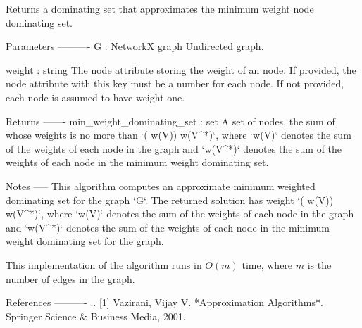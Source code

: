 \begin{DoxyVerb}Returns a dominating set that approximates the minimum weight node
dominating set.

Parameters
----------
G : NetworkX graph
    Undirected graph.

weight : string
    The node attribute storing the weight of an node. If provided,
    the node attribute with this key must be a number for each
    node. If not provided, each node is assumed to have weight one.

Returns
-------
min_weight_dominating_set : set
    A set of nodes, the sum of whose weights is no more than `(\log
    w(V)) w(V^*)`, where `w(V)` denotes the sum of the weights of
    each node in the graph and `w(V^*)` denotes the sum of the
    weights of each node in the minimum weight dominating set.

Notes
-----
This algorithm computes an approximate minimum weighted dominating
set for the graph `G`. The returned solution has weight `(\log
w(V)) w(V^*)`, where `w(V)` denotes the sum of the weights of each
node in the graph and `w(V^*)` denotes the sum of the weights of
each node in the minimum weight dominating set for the graph.

This implementation of the algorithm runs in $O(m)$ time, where $m$
is the number of edges in the graph.

References
----------
.. [1] Vazirani, Vijay V.
       *Approximation Algorithms*.
       Springer Science & Business Media, 2001.\end{DoxyVerb}
 